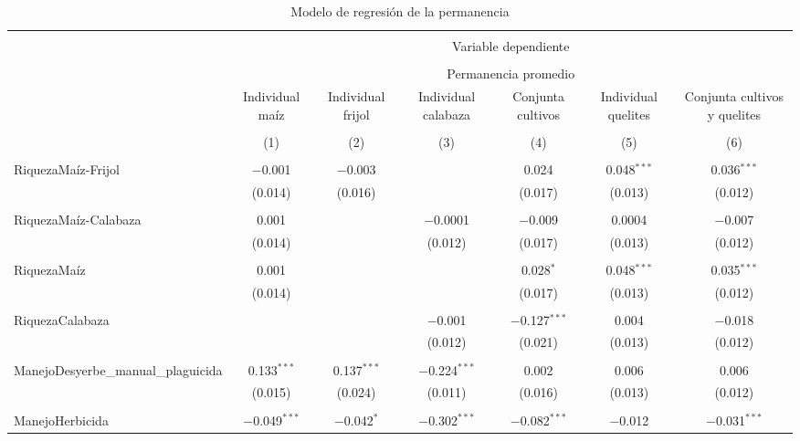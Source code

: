 \documentclass[spanish,11pt]{article}
\begin{document}
\begin{table}[!htbp] \centering 
  \caption{Modelo de regresión de la permanencia} 
  \label{} 
\begin{tabular}{@{\extracolsep{5pt}}lcccccc} 
\\[-1.8ex]\hline 
\hline \\[-1.8ex] 
 & \multicolumn{6}{c}{Variable dependiente} \\ 
\cline{2-7} 
\\[-1.8ex] & \multicolumn{6}{c}{Permanencia promedio} \\ 
 & Individual maíz & Individual frijol & Individual calabaza & Conjunta cultivos & Individual quelites & Conjunta cultivos y quelites \\ 
\\[-1.8ex] & (1) & (2) & (3) & (4) & (5) & (6)\\ 
\hline \\[-1.8ex] 
 RiquezaMaíz-Frijol & $-$0.001 & $-$0.003 &  & 0.024 & 0.048$^{***}$ & 0.036$^{***}$ \\ 
  & (0.014) & (0.016) &  & (0.017) & (0.013) & (0.012) \\ 
  & & & & & & \\ 
 RiquezaMaíz-Calabaza & 0.001 &  & $-$0.0001 & $-$0.009 & 0.0004 & $-$0.007 \\ 
  & (0.014) &  & (0.012) & (0.017) & (0.013) & (0.012) \\ 
  & & & & & & \\ 
 RiquezaMaíz & 0.001 &  &  & 0.028$^{*}$ & 0.048$^{***}$ & 0.035$^{***}$ \\ 
  & (0.014) &  &  & (0.017) & (0.013) & (0.012) \\ 
  & & & & & & \\ 
 RiquezaCalabaza &  &  & $-$0.001 & $-$0.127$^{***}$ & 0.004 & $-$0.018 \\ 
  &  &  & (0.012) & (0.021) & (0.013) & (0.012) \\ 
  & & & & & & \\ 
 ManejoDesyerbe\_manual\_plaguicida & 0.133$^{***}$ & 0.137$^{***}$ & $-$0.224$^{***}$ & 0.002 & 0.006 & 0.006 \\ 
  & (0.015) & (0.024) & (0.011) & (0.016) & (0.013) & (0.012) \\ 
  & & & & & & \\ 
 ManejoHerbicida & $-$0.049$^{***}$ & $-$0.042$^{*}$ & $-$0.302$^{***}$ & $-$0.082$^{***}$ & $-$0.012 & $-$0.031$^{***}$ \\ 

\end{tabular}
\end{table}
\end{document}
